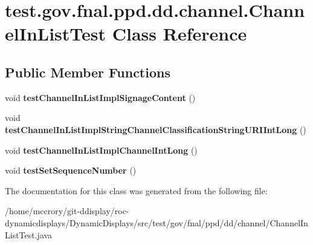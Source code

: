 \hypertarget{classtest_1_1gov_1_1fnal_1_1ppd_1_1dd_1_1channel_1_1ChannelInListTest}{\section{test.\-gov.\-fnal.\-ppd.\-dd.\-channel.\-Channel\-In\-List\-Test Class Reference}
\label{classtest_1_1gov_1_1fnal_1_1ppd_1_1dd_1_1channel_1_1ChannelInListTest}
}
\subsection*{Public Member Functions}
\begin{DoxyCompactItemize}
\item 
\hypertarget{classtest_1_1gov_1_1fnal_1_1ppd_1_1dd_1_1channel_1_1ChannelInListTest_a2bcc4b72006187abddd87528e7ea959d}{void {\bfseries test\-Channel\-In\-List\-Impl\-Signage\-Content} ()}\label{classtest_1_1gov_1_1fnal_1_1ppd_1_1dd_1_1channel_1_1ChannelInListTest_a2bcc4b72006187abddd87528e7ea959d}

\item 
\hypertarget{classtest_1_1gov_1_1fnal_1_1ppd_1_1dd_1_1channel_1_1ChannelInListTest_a5e7d302450f7aec76a94b96781404ab6}{void {\bfseries test\-Channel\-In\-List\-Impl\-String\-Channel\-Classification\-String\-U\-R\-I\-Int\-Long} ()}\label{classtest_1_1gov_1_1fnal_1_1ppd_1_1dd_1_1channel_1_1ChannelInListTest_a5e7d302450f7aec76a94b96781404ab6}

\item 
\hypertarget{classtest_1_1gov_1_1fnal_1_1ppd_1_1dd_1_1channel_1_1ChannelInListTest_aee88b93d2126b4b30ac17e5b1830687a}{void {\bfseries test\-Channel\-In\-List\-Impl\-Channel\-Int\-Long} ()}\label{classtest_1_1gov_1_1fnal_1_1ppd_1_1dd_1_1channel_1_1ChannelInListTest_aee88b93d2126b4b30ac17e5b1830687a}

\item 
\hypertarget{classtest_1_1gov_1_1fnal_1_1ppd_1_1dd_1_1channel_1_1ChannelInListTest_abf6a6df06cd8c86afb8ff5ca4da14591}{void {\bfseries test\-Set\-Sequence\-Number} ()}\label{classtest_1_1gov_1_1fnal_1_1ppd_1_1dd_1_1channel_1_1ChannelInListTest_abf6a6df06cd8c86afb8ff5ca4da14591}

\end{DoxyCompactItemize}


The documentation for this class was generated from the following file\-:\begin{DoxyCompactItemize}
\item 
/home/mccrory/git-\/ddisplay/roc-\/dynamicdisplays/\-Dynamic\-Displays/src/test/gov/fnal/ppd/dd/channel/Channel\-In\-List\-Test.\-java\end{DoxyCompactItemize}
